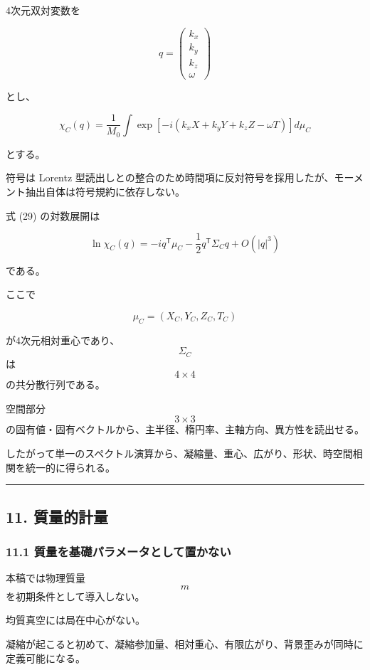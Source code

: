 \documentclass[
  a4paper,
]{ltjsarticle}
\begin{document}
4次元双対変数を

\[
q
=
\begin{pmatrix}
k_x\\
k_y\\
k_z\\
\omega
\end{pmatrix}
\]

とし、

\[
\boxed{
\chi_C(q)
=
\frac{1}{M_0}
\int
\exp
\left[
-i
\left(
k_xX+k_yY+k_zZ-\omega T
\right)
\right]
d\mu_C
}
\tag{29}
\]

とする。

符号は Lorentz
型読出しとの整合のため時間項に反対符号を採用したが、モーメント抽出自体は符号規約に依存しない。

式 (29) の対数展開は

\[
\boxed{
\ln\chi_C(q)
=
-iq^{\mathsf T}\mu_C
-
\frac12q^{\mathsf T}\Sigma_C q
+
O(|q|^3)
}
\tag{30}
\]

である。

ここで

\[
\boxed{
\mu_C
=
(X_C,Y_C,Z_C,T_C)
}
\tag{31}
\]

が4次元相対重心であり、\[\Sigma_C\] は \[4\times4\] の共分散行列である。

空間部分 \[3\times3\]
の固有値・固有ベクトルから、主半径、楕円率、主軸方向、異方性を読出せる。

したがって単一のスペクトル演算から、凝縮量、重心、広がり、形状、時空間相関を統一的に得られる。

\begin{center}\rule{0.5\linewidth}{0.5pt}\end{center}

\subsection{11. 質量的計量}\label{ux8ceaux91cfux7684ux8a08ux91cf}

\subsubsection{11.1
質量を基礎パラメータとして置かない}\label{ux8ceaux91cfux3092ux57faux790eux30d1ux30e9ux30e1ux30fcux30bfux3068ux3057ux3066ux7f6eux304bux306aux3044}

本稿では物理質量 \[m\] を初期条件として導入しない。

均質真空には局在中心がない。

凝縮が起こると初めて、凝縮参加量、相対重心、有限広がり、背景歪みが同時に定義可能になる。
\end{document}

